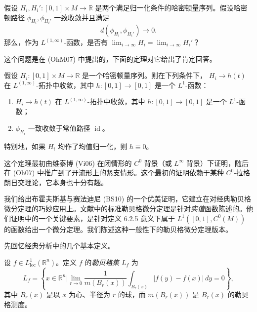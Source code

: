 \begin{question}\label{ques:uniqueness-limits-topological-hamiltonians}
假设 $H_i,H_i':[0,1]\times M\to\mathbb R$ 是两个满足归一化条件的哈密顿量序列。假设哈密顿路径
$\phi_{H_i},\phi_{H_i'}$ 一致收敛并且满足
\[
 d(\phi_{H_i},\phi_{H_i'})\longrightarrow0.
\]
那么，作为 $L^{(1,\infty)}$-函数，是否有
$\lim_{i\to\infty}H_i=\lim_{i\to\infty}H_i'$？
\end{question}

这个问题是在 (OhM07) 中提出的，下面的定理对它给出了肯定回答。

\begin{theorem}
\label{thm:viterbo-buhovsky-seyfaddini-uniqueness}
假设 $H_i:[0,1]\times M\to\mathbb R$ 是一个哈密顿量序列。则在下列条件下，
$H_i\to h(t)$ 在 $L^{(1,\infty)}$-拓扑中收敛，其中
$h:[0,1]\to[0,1]$ 是一个 $L^1$-函数：
\begin{enumerate}[label=(\arabic*)]
 \item $H_i\to h(t)$ 在 $L^{(1,\infty)}$-拓扑中收敛，其中
 $h:[0,1]\to[0,1]$ 是一个 $L^1$-函数；
 \item $\phi_{H_i}$ 一致收敛于常值路径 $\operatorname{id}$。
\end{enumerate}
特别地，如果 $H_i$ 均作了均值归一化，则 $h\equiv0$。
\end{theorem}

这个定理最初由维泰博 (Vi06) 在闭情形的 $C^0$ 背景（或
$L^\infty$ 背景）下证明，随后在 (Oh07) 中推广到了开流形上的紧支情形。这个最初的证明依赖于某种
$C^0$-拉格朗日交理论，它本身也十分有趣。

我们给出布霍夫斯基与赛法迪尼 (BS10) 的一个优美证明，它建立在对经典勒贝格微分定理的巧妙应用上。文献中的标准勒贝格微分定理是针对\emph{实值}函数陈述的。他们证明中的一个关键要素，是针对定义 6.2.5 意义下属于
$L^1([0,1],C^0(M))$ 的函数给出一个微分定理。我们陈述这种一般性下的勒贝格微分定理版本。

先回忆经典分析中的几个基本定义。

\begin{definition}\label{def:lebesgue-set}
设 $f\in L^1_{\mathrm{loc}}(\mathbb R^n)$。定义 $f$ 的\emph{勒贝格集} $L_f$ 为
\[
 L_f=\left\{x\in\mathbb R^n\mathrel{\bigg|}
 \lim_{r\to0}\frac1{m(B_r(x))}
 \int_{B_r(x)}|f(y)-f(x)|\,dy=0\right\},
\]
其中 $B_r(x)$ 是以 $x$ 为心、半径为 $r$ 的球，而
$m(B_r(x))$ 是 $B_r(x)$ 的勒贝格测度。
\end{definition}

